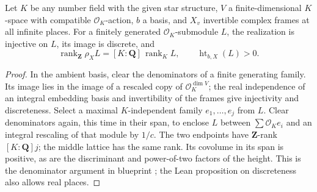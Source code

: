 
\begin{theorem}\label{pn:P050}
Let \(K\) be any number field with the given star structure, \(V\) a finite-dimensional \(K\)-space with compatible \(\mathcal O_K\)-action, \(b\) a basis, and \(X_v\) invertible complex frames at all infinite places. For a finitely generated \(\mathcal O_K\)-submodule \(L\), the realization is injective on \(L\), its image is discrete, and
\[
 \operatorname{rank}_{\mathbf Z}\rho_X L=[K:\mathbf Q]\,\operatorname{rank}_K L,
 \qquad \operatorname{ht}_{b,X}(L)>0 .
\]
\end{theorem}
\begin{proof}
In the ambient basis, clear the denominators of a finite generating family. Its image lies in the image of a rescaled copy of \(\mathcal O_K^{\dim V}\); the real independence of an integral embedding basis and invertibility of the frames give injectivity and discreteness. Select a maximal \(K\)-independent family \(e_1,\ldots,e_j\) from \(L\). Clear denominators again, this time in their span, to enclose \(L\) between \(\sum\mathcal O_K e_i\) and an integral rescaling of that module by \(1/c\). The two endpoints have \(\mathbf Z\)-rank \([K:\mathbf Q]j\); the middle lattice has the same rank. Its covolume in its span is positive, as are the discriminant and power-of-two factors of the height. This is the denominator argument in blueprint ; the Lean proposition on discreteness also allows real places.
\end{proof}
